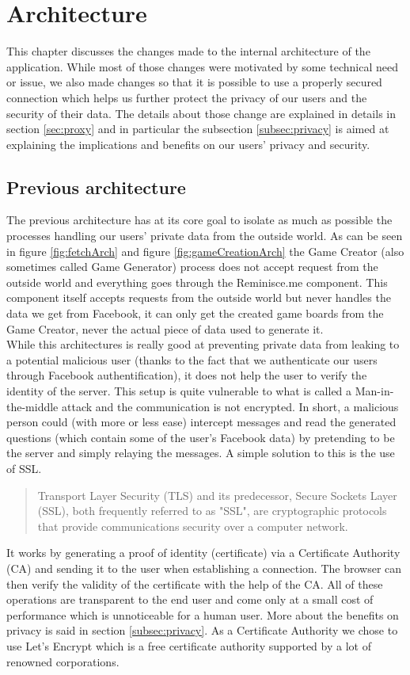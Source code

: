 \chapter{Architecture}
This chapter discusses the changes made to the internal architecture of the application. While most of those changes were motivated by some technical need or issue, we also made changes so that it is possible to use a properly secured connection which helps us further protect the privacy of our users and the security of their data. The details about those change are explained in details in section \ref{sec:proxy} and in particular the subsection \ref{subsec:privacy} is aimed at explaining the implications and benefits on our users' privacy and security.
\section{Previous architecture}
The previous architecture has at its core goal to isolate as much as possible the processes handling our users' private data from the outside world. As can be seen in figure \ref{fig:fetchArch} and figure \ref{fig:gameCreationArch} the Game Creator (also sometimes called Game Generator) process does not accept request from the outside world and everything goes through the Reminisce.me component. This component itself accepts requests from the outside world but never handles the data we get from Facebook, it can only get the created game boards from the Game Creator, never the actual piece of data used to generate it.\\
While this architectures is really good at preventing private data from leaking to a potential malicious user (thanks to the fact that we authenticate our users through Facebook authentification), it does not help the user to verify the identity of the server. This setup is quite vulnerable to what is called a Man-in-the-middle attack\cite{mitm} and the communication is not encrypted. In short, a malicious person could (with more or less ease) intercept messages and read the generated questions (which contain some of the user's Facebook data) by pretending to be the server and simply relaying the messages.
A simple solution to this is the use of SSL\cite{whyssl}.\blockquote{Transport Layer Security (TLS) and its predecessor, Secure Sockets Layer (SSL), both frequently referred to as "SSL", are cryptographic protocols that provide communications security over a computer network.\cite{ssl}}
It works by generating a proof of identity (certificate) via a Certificate Authority\cite{ca} (CA) and sending it to the user when establishing a connection. The browser can then verify the validity of the certificate with the help of the CA. All of these operations are transparent to the end user and come only at a small cost of performance which is unnoticeable for a human user. More about the benefits on privacy is said in section \ref{subsec:privacy}. As a Certificate Authority we chose to use Let's Encrypt\cite{letsencrypt} which is a free certificate authority supported by a lot of renowned corporations.

